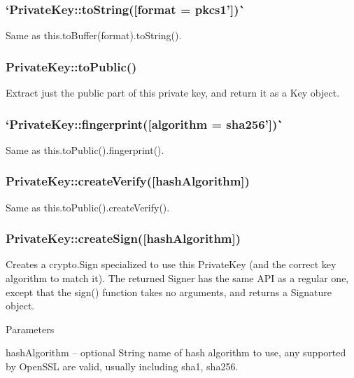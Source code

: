 \subsubsection*{`Private\+Key\+::to\+String(\mbox{[}format = \textquotesingle{}pkcs1'\mbox{]})\`{}}

Same as {\ttfamily this.\+to\+Buffer(format).to\+String()}.

\subsubsection*{{\ttfamily Private\+Key\+::to\+Public()}}

Extract just the public part of this private key, and return it as a {\ttfamily Key} object.

\subsubsection*{`Private\+Key\+::fingerprint(\mbox{[}algorithm = \textquotesingle{}sha256'\mbox{]})\`{}}

Same as {\ttfamily this.\+to\+Public().fingerprint()}.

\subsubsection*{{\ttfamily Private\+Key\+::create\+Verify(\mbox{[}hash\+Algorithm\mbox{]})}}

Same as {\ttfamily this.\+to\+Public().create\+Verify()}.

\subsubsection*{{\ttfamily Private\+Key\+::create\+Sign(\mbox{[}hash\+Algorithm\mbox{]})}}

Creates a {\ttfamily crypto.\+Sign} specialized to use this Private\+Key (and the correct key algorithm to match it). The returned Signer has the same A\+PI as a regular one, except that the {\ttfamily sign()} function takes no arguments, and returns a {\ttfamily Signature} object.

Parameters


\begin{DoxyItemize}
\item {\ttfamily hash\+Algorithm} -- optional String name of hash algorithm to use, any supported by Open\+S\+SL are valid, usually including {\ttfamily sha1}, {\ttfamily sha256}.
\end{DoxyItemize}

